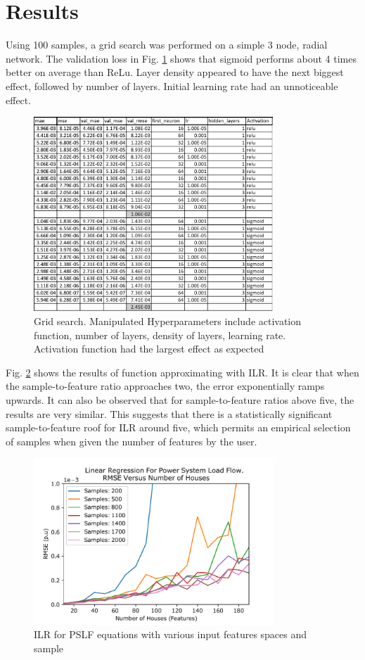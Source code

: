 \documentclass[conference]{IEEEtran}
\begin{document}
\section{Results}
\label{sec:results}

Using 100 samples, a grid search was performed on a simple 3 node, radial network. The validation loss in Fig. \ref{fig:gridsearch} shows that sigmoid performs about 4 times better on average than ReLu. Layer density appeared to have the next biggest effect, followed by number of layers. Initial learning rate had an unnoticeable effect.

\begin{figure}[h]
	\centering
	\includegraphics[width=9cm]{gridsearch.pdf}
	\caption{Grid search. Manipulated Hyperparameters include activation function, number of layers, density of layers, learning rate. Activation function had the largest effect as expected}
	\label{fig:gridsearch}
\end{figure}

Fig. \ref{fig:ilrresults} shows the results of function approximating with ILR. It is clear that when the sample-to-feature ratio approaches two, the error exponentially ramps upwards. It can also be observed that for sample-to-feature ratios above five, the results are very similar. This suggests that there is a statistically significant sample-to-feature roof for ILR around five, which permits an empirical selection of samples when given the number of features by the user.

\begin{figure}[h]
	\centering
	\includegraphics[width=9cm]{ilrrmsevsfeatures_familyofcurves.pdf}
	\caption{ILR for PSLF equations with various input features spaces and sample}
	\label{fig:ilrresults}
\end{figure}
\end{document}

